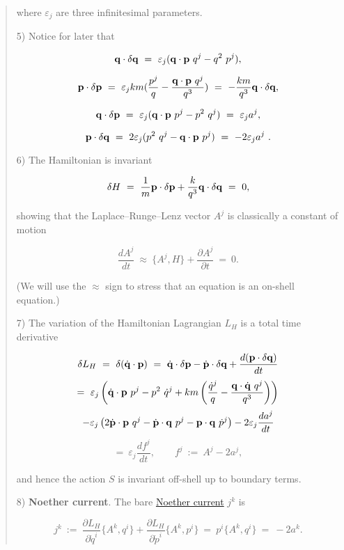 \begin{quote}
        where $\varepsilon_j$ are three infinitesimal parameters.

        5) Notice for later that

        $$ {\bf q}\cdot\delta {\bf q}~=~\varepsilon_j({\bf q}\cdot{\bf p}~q^j - q^2~p^j),  $$

        $$ {\bf p}\cdot\delta {\bf p}
        ~=~\varepsilon_j km(\frac{p^j}{q}-\frac{{\bf q}\cdot{\bf p}~q^j}{q^3})~=~- \frac{km}{q^3}{\bf q}\cdot\delta {\bf q},  $$

        $$ {\bf q}\cdot\delta {\bf p}~=~\varepsilon_j({\bf q}\cdot{\bf p}~p^j - p^2~q^j )~=~\varepsilon_j a^j,  $$

        $$ {\bf p}\cdot\delta {\bf q}~=~2\varepsilon_j( p^2~q^j - {\bf q}\cdot{\bf p}~p^j)~=~-2\varepsilon_j a^j~.  $$

        6) The Hamiltonian is invariant

        $$ \delta  H ~=~ \frac{1}{m}{\bf p}\cdot\delta {\bf p} + \frac{k}{q^3}{\bf q}\cdot\delta {\bf q}~=~0, $$

        showing that the Laplace–Runge–Lenz vector $A^j$ is classically a constant of motion 

        $$\frac{dA^j}{dt} ~\approx~ \{ A^j, H\}+\frac{\partial A^j}{\partial t} ~=~  0.$$   

        (We will use the $\approx$ sign to stress that an equation is an on-shell equation.) 

        7) The variation of the Hamiltonian Lagrangian $L_H$ is a total time derivative

        $$ \delta L_H~=~ \delta  (\dot{\bf q}\cdot{\bf p})~=~ \dot{\bf q}\cdot\delta {\bf p} - \dot{\bf p}\cdot\delta {\bf q} + \frac{d({\bf p}\cdot\delta {\bf q})}{dt} $$
        $$  =~ \varepsilon_j\left( \dot{\bf q}\cdot{\bf p}~p^j - p^2~\dot{q}^j +  km\left( \frac{\dot{q}^j}{q} -  \frac{{\bf q} \cdot \dot{\bf q}~q^j}{q^3}\right)\right)    $$
        $$- \varepsilon_j\left(2 \dot{\bf p}\cdot{\bf p}~q^j - \dot{\bf p}\cdot{\bf q}~p^j- {\bf p}\cdot{\bf q}~\dot{p}^j  \right) - 2\varepsilon_j\frac{da^j}{dt}$$
        $$ =~\varepsilon_j\frac{df^j}{dt}, \qquad f^j ~:=~ A^j-2a^j, $$

        and hence the action $S$ is invariant off-shell up to boundary terms.

        8) \textbf{Noether current}. The bare \href{http://en.wikipedia.org/wiki/Noether%27s_theorem}{Noether current} $j^k$ is

        $$j^k~:=~ \frac{\partial L_H}{\partial \dot{q}^i}  \{A^k,q^i\}+\frac{\partial L_H}{\partial \dot{p}^i}  \{A^k,p^i\}
        ~=~ p^i\{A^k,q^i\}~=~ -2a^k. $$


\end{quote}
